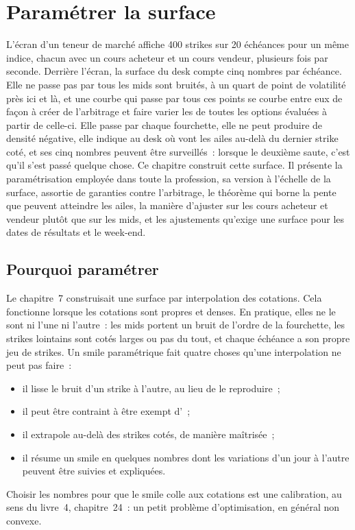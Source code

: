 \chapter{Paramétrer la surface}\label{ch:dv:parametrising-the-surface}

L'écran d'un teneur de marché affiche 400 strikes sur 20 échéances pour un même indice, chacun
avec un cours acheteur et un cours vendeur, plusieurs fois par seconde. Derrière l'écran, la
surface du desk compte cinq nombres par échéance. Elle ne passe pas par tous les
mids sont bruités, à un quart de point de volatilité près ici et là, et une courbe
qui passe par tous ces points se courbe entre eux de façon à créer
de l'arbitrage et faire varier les  de toutes les options évaluées à partir de celle-ci. Elle passe
par chaque fourchette, elle ne peut produire de densité négative, elle indique au
desk où vont les ailes au-delà du dernier strike coté, et ses cinq nombres peuvent
être surveillés~: lorsque le deuxième saute, c'est qu'il s'est passé quelque chose. Ce chapitre construit
cette surface. Il présente la paramétrisation employée dans toute la profession, sa
version à l'échelle de la surface, assortie de garanties contre l'arbitrage, le théorème qui borne
la pente que peuvent atteindre les ailes, la manière d'ajuster sur les cours acheteur et vendeur plutôt que
sur les mids, et les ajustements qu'exige une surface pour les dates de résultats et le week-end.

\section{Pourquoi paramétrer}

Le chapitre~7 construisait une surface par interpolation des cotations. Cela fonctionne lorsque les cotations sont
propres et denses. En pratique, elles ne le sont ni l'une ni l'autre~: les mids portent un bruit de l'ordre de la
fourchette, les strikes lointains sont cotés larges ou pas du tout, et chaque échéance a son
propre jeu de strikes. Un smile paramétrique fait quatre choses qu'une interpolation ne peut pas faire~:
\begin{itemize}
\item il lisse le bruit d'un strike à l'autre, au lieu de le reproduire~;
\item il peut être contraint à être exempt d'~;
\item il extrapole au-delà des strikes cotés, de manière maîtrisée~;
\item il résume un smile en quelques nombres dont les variations d'un jour à l'autre peuvent être suivies
et expliquées.
\end{itemize}
Choisir les nombres pour que le smile colle aux cotations est une calibration, au sens du
livre~4, chapitre~24~: un petit problème d'optimisation, en général non
convexe.

